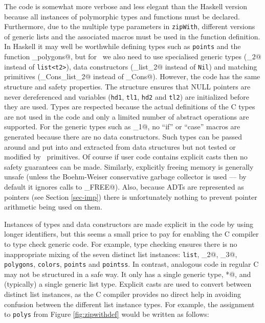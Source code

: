 The code is somewhat more verbose and less elegant than the Haskell version
because all instances of polymorphic types and functions must be declared.
Furthermore, due to the multiple type parameters in \texttt{zipWith},
different versions of generic lists and the associated macros must be used
in the function definition.
In Haskell it may well be worthwhile defining types such as
\texttt{points} and the function \verb@mk_polygons@, but for \adtpp\ we
also need to use specialised generic types (\verb@list_2@ instead of
\texttt{list<t2>}), data constructors (\verb@Nil_list_2@ instead of
\texttt{Nil}) and matching primitives (\verb@if_Cons_list_2@ instead of
\verb@if_Cons@).  However, the code has the same structure
and safety properties.  The structure ensures that NULL pointers are
never dereferenced and variables (\texttt{hd1}, \texttt{tl1},
\texttt{hd2} and \texttt{tl2}) are initialized before they are used.
Types are respected because the actual definitions of the C types are
not used in the code and only a limited number of abstract operations
are supported.  For the generic types such as \verb@adt_1@, no ``if'' or
``case'' macros are generated because there are no data constructors.
Such types can be passed around and put into and extracted
from data structures but not tested or modified by \adtpp\ primitives.
Of course if user code contains explicit casts then no safety guarantees
can be made.  Similarly, explicitly freeing memory is generally unsafe
(unless the Boehm-Weiser conservative garbage collector is used --- by
default it ignores calls to \verb@GC_FREE@).
Also, because ADTs are represented as pointers (see Section
\ref{sec-imp}) there is unfortunately nothing to prevent pointer
arithmetic being used on them.

Instances of types and data constructors are made explicit
in the code by using longer identifiers, but this seems a small
price to pay for enabling the C compiler to type check generic code.
For example, type checking ensures there is no inappropriate mixing
of the seven distinct list instances: \texttt{list}, \verb@list_2@,
\verb@list_3@, \texttt{polygons}, \texttt{colors}, \texttt{points}
and \texttt{pointss}.  In contrast, analogous code in regular C may
not be structured in a safe way.  It only has a single generic type,
\verb@void*@, and (typically) a single generic list type.  Explicit
casts are used to convert between distinct list instances, as the C
compiler provides no direct help in avoiding confusion between the
different list instance types.  For example, the assignment to
\texttt{polys} from Figure \ref{fig:zipwithdef} would be written as follows:

